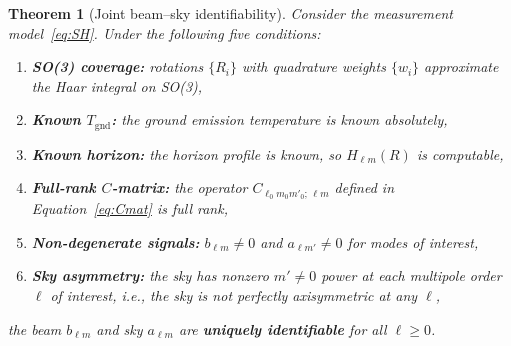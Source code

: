 \documentclass{aastex631}
\newcommand{\blm}{b_{\ell m}}
\newcommand{\alm}{a_{\ell m}}
\newcommand{\Hlm}{H_{\ell m}}
\newcommand{\Tgnd}{T_\mathrm{gnd}}
\theoremstyle{plain}
\newtheorem{theorem}{Theorem}
\theoremstyle{remark}
\begin{document}
\begin{theorem}[Joint beam--sky identifiability]
Consider the measurement model~\ref{eq:SH}.
Under the following five conditions:
\begin{enumerate}
  \item[\textbf{C1.}] \textbf{SO(3) coverage:} rotations $\{R_i\}$ with
    quadrature weights $\{w_i\}$ approximate the Haar integral on SO(3),
  \item[\textbf{C2.}] \textbf{Known $\Tgnd$:} the ground emission
    temperature is known absolutely,
  \item[\textbf{C3.}] \textbf{Known horizon:} the horizon profile is
    known, so $\Hlm(R)$ is computable,
  \item[\textbf{C4.}] \textbf{Full-rank $C$-matrix:} the operator
    $C_{\ell_0 m_0 m'_0;\,\ell m}$ defined in Equation~\ref{eq:Cmat}
    is full rank,
  \item[\textbf{C5.}] \textbf{Non-degenerate signals:}
    $b_{\ell m} \neq 0$ and $a_{\ell m'} \neq 0$ for modes of interest,
  \item[\textbf{C6.}] \textbf{Sky asymmetry:} the sky has nonzero
    $m' \neq 0$ power at each multipole order $\ell$ of interest,
    i.e., the sky is not perfectly axisymmetric at any $\ell$,
\end{enumerate}
the beam $\blm$ and sky $\alm$ are \textbf{uniquely identifiable}
for all $\ell \geq 0$.
\end{theorem}
\end{document}
